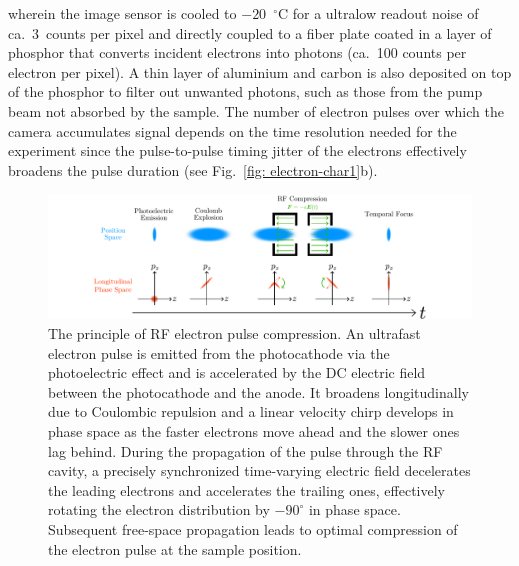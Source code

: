 wherein the image sensor is cooled to $-20$~$^{\circ}$C for a ultralow readout noise of
ca.~3~counts per pixel and directly coupled to a fiber plate coated in a layer of phosphor that
converts incident electrons into photons (ca.~100 counts per electron per pixel).
A thin layer of aluminium and carbon is also deposited on top of the phosphor
to filter out unwanted photons, such as those from the pump beam not absorbed by the sample.
The number of electron pulses over which the camera accumulates signal depends on
the time resolution needed for the experiment since the pulse-to-pulse timing jitter of
the electrons effectively broadens the pulse duration (see Fig.~\ref{fig: electron-char1}b).
%
\begin{figure}[t!]
  \centering
  \includegraphics[width = \textwidth]{Figures/fig_ch2_RF-compression.pdf}
  \caption[The principle of RF electron pulse compression.]{
    The principle of RF electron pulse compression. An ultrafast electron pulse is emitted from
    the photocathode via the photoelectric effect and
    is accelerated by the DC electric field between the photocathode and the anode.
    It broadens longitudinally due to Coulombic repulsion and
    a linear velocity chirp develops in phase space as the faster electrons move ahead and
    the slower ones lag behind. During the propagation of the pulse through the RF cavity,
    a precisely synchronized time-varying electric field decelerates the leading electrons
    and accelerates the trailing ones, effectively rotating the electron distribution by
    $-90^{\circ}$ in phase space. Subsequent free-space propagation leads to
    optimal compression of the electron pulse at the sample position.
  }
  \label{fig: RF-compression}
\end{figure}

